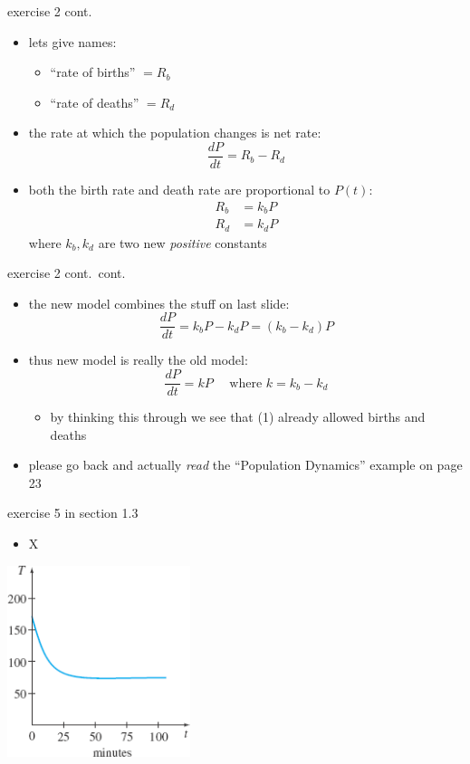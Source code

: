 \documentclass{beamer}
\begin{document}
\begin{frame}{exercise 2 cont.}

\begin{itemize}
\item lets give names:
    \begin{itemize}
    \item ``rate of births'' $= R_b$
    \item ``rate of deaths'' $= R_d$
    \end{itemize}
\item the rate at which the population changes is net rate:
    $$\frac{dP}{dt} = R_b - R_d$$
\item both the birth rate and death rate are proportional to $P(t)$:
\begin{align*}
    R_b &= k_b P \\
    R_d &= k_d P
\end{align*}
where $k_b,k_d$ are two new \emph{positive} constants
\end{itemize}
\end{frame}


\begin{frame}{exercise 2 cont.~cont.}

\begin{itemize}
\item the new model combines the stuff on last slide:
    $$\frac{dP}{dt} = k_b P - k_d P = (k_b-k_d) P$$
\item thus new model is really the old model:
    $$\frac{dP}{dt} = k P \quad \text{ where } k = k_b-k_d$$
    \begin{itemize}
    \item by thinking this through we see that (1) already allowed births and deaths
    \end{itemize}

\bigskip
\item \alert{please go back and actually \emph{read} the ``Population Dynamics'' example on page 23}
\end{itemize}
\end{frame}


\begin{frame}{exercise 5 in section 1.3}

\begin{itemize}
\item X
\end{itemize}

\includegraphics[width=0.4\textwidth]{exercise-5-1-3}
\end{frame}
\end{document}
